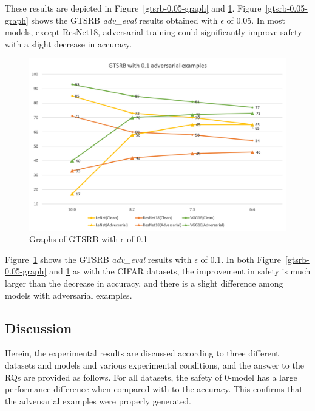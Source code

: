 \documentclass[journal,article,submit,moreauthors,pdftex]{Definitions/mdpi}
\begin{document}
These results are depicted in Figure~\ref{gtsrb-0.05-graph} and \ref{gtsrb-0.1-graph}.
Figure~\ref{gtsrb-0.05-graph} shows the GTSRB {\it adv\_eval} results obtained with \begin{math}\epsilon\end{math} of 0.05.
In most models, except ResNet18, adversarial training could significantly improve safety with a slight decrease in accuracy.

\begin{figure}[H]
    \includegraphics[width=13 cm]{Definitions/graph-01gtsrb.png}
    \caption{Graphs of GTSRB with \begin{math}\epsilon\end{math} of 0.1\label{gtsrb-0.1-graph}}
\end{figure} 

Figure~\ref{gtsrb-0.1-graph} shows the GTSRB {\it adv\_eval} results with \begin{math}\epsilon\end{math} of 0.1.
In both Figure~\ref{gtsrb-0.05-graph} and \ref{gtsrb-0.1-graph} as with the CIFAR datasets, the improvement in safety is much larger than the decrease in accuracy, and there is a slight difference among models with adversarial examples.

\subsection{Discussion}

Herein, the experimental results are discussed according to three different datasets and models and various experimental conditions, and the answer to the RQs are provided as follows.
For all datasets, the safety of 0-model has a large performance difference when compared with to the accuracy. This confirms that the adversarial examples were properly generated.
\end{document}
